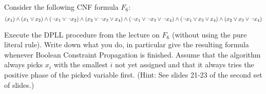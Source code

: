 \documentclass[addpoints,12pt]{exam}
\begin{document}
\begin{questions}


\newpage
\question[20]
\vspace*{5pt}

Consider the following CNF formula $F_6$:
\[(x_1) \land (x_1 \lor x_2) \land (\neg x_1 \lor \neg x_2) \land (x_2 \lor \neg x_3 \lor x_4) \\
\land (\neg x_1 \lor \neg x_3 \lor \neg x_4) \land (\neg x_1 \lor x_3 \lor x_4) \land (x_2 \lor x_3 \lor \neg x_4)\]

Execute the DPLL procedure from the lecture on $F_6$ (without using the pure literal rule).
Write down what you do, in particular give the
resulting formula whenever Boolean Constraint Propagation is finished. Assume that the
algorithm always picks  $x_i$ with the smallest $i$ not yet assigned and that it always tries
the positive phase of the picked variable first.
(Hint: See slides 21-23 of the second set of slides.)


\end{questions}
\end{document}
